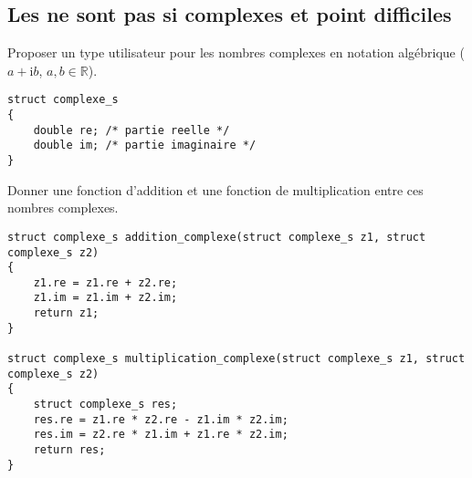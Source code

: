 \subsection*{Les  ne sont pas si complexes et point difficiles}

\begin{lastenu}
\item Proposer un type utilisateur pour les nombres complexes en
  notation algébrique ($a + \mathrm{i} b$, $a,b\in\mathbb{R}$).

  \begin{correction}
\begin{verbatim}
struct complexe_s
{
    double re; /* partie reelle */
    double im; /* partie imaginaire */
}
\end{verbatim}
  \end{correction}

\item Donner une fonction d'addition et une fonction de multiplication
  entre ces nombres complexes.

  \begin{correction}
\begin{verbatim}
struct complexe_s addition_complexe(struct complexe_s z1, struct complexe_s z2)
{
    z1.re = z1.re + z2.re;
    z1.im = z1.im + z2.im;
    return z1;
}

struct complexe_s multiplication_complexe(struct complexe_s z1, struct complexe_s z2)
{
    struct complexe_s res;
    res.re = z1.re * z2.re - z1.im * z2.im;
    res.im = z2.re * z1.im + z1.re * z2.im;
    return res;
}
\end{verbatim}
  \end{correction}
\end{lastenu}


